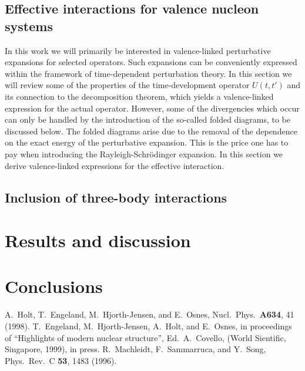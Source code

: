 \subsection{Effective interactions for valence nucleon systems}
\label{subsec:sec21}

In this work we will primarily be interested in valence-linked
perturbative expansions for selected operators. Such expansions
can be conveniently expressed within the framework of time-dependent
perturbation theory. In this section we will review some of the
properties of the time-development operator $U(t,t')$ and its
connection to the decomposition theorem, which yields a
valence-linked expression for the actual operator. However, some
of the divergencies which occur can only be handled by the
introduction of the so-called folded diagrams, to be
discussed below. The folded diagrams
arise due to the removal of the dependence on the exact
energy of the perturbative expansion. This is the price one has
to pay when introducing the Rayleigh-Schr\"{o}dinger expansion.
In this section we derive valence-linked expressions for 
the effective interaction.

\subsection{Inclusion of three-body interactions}\label{subsec:sec22}

\section{Results and discussion}\label{sec:sec3}


\section{Conclusions}\label{sec:sec4}


\begin{thebibliography}{99}

 A.\ Holt, T.\ Engeland, M.\ Hjorth-Jensen, and E.\ Osnes,
Nucl.\ Phys.\ {\bf A634}, 41 (1998).
 T.\ Engeland, M.\ Hjorth-Jensen, A.\ Holt, and E.\ Osnes,
in proceedings of ``Highlights of modern nuclear structure'', Ed.\ A.\ Covello,
(World Sientific, Singapore, 1999), in press.
  R.\ Machleidt, F.\ Sammarruca, and Y.\ Song,
Phys.\ Rev.\ C {\bf 53}, 1483 (1996).

\end{thebibliography}

